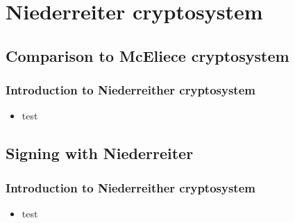 \section[Niederreiter]{Niederreiter cryptosystem}
	\subsection{Comparison to McEliece cryptosystem}

		\begin{frame}
			\frametitle{Introduction to Niederreither cryptosystem}
			\begin{itemize}
				\item test
			\end{itemize}
		\end{frame}	
	
	\subsection{Signing with Niederreiter}

		\begin{frame}
			\frametitle{Introduction to Niederreither cryptosystem}
			\begin{itemize}
				\item test
			\end{itemize}
		\end{frame}